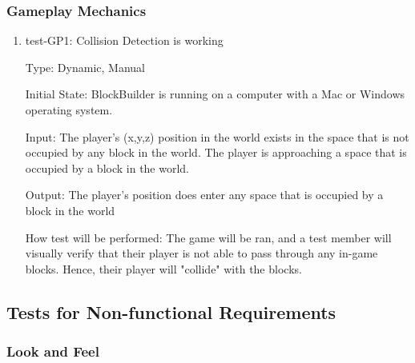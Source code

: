 \documentclass[12pt, titlepage]{article}
\begin{document}
\subsubsection{Gameplay Mechanics}

\begin{enumerate}

\item{test-GP1: Collision Detection is working\\}

Type: Dynamic, Manual
					
Initial State: BlockBuilder is running on a computer with a Mac or Windows operating system.
					
Input: The player's (x,y,z) position in the world exists in the space that is not occupied by any block in the world. The player is approaching a space that is occupied by a block in the world.
					
Output: The player's position does enter any space that is occupied by a block in the world
					
How test will be performed: The game will be ran, and a test member will visually verify that their player is not able to pass through any in-game blocks. Hence, their player will "collide" with the blocks.

\end{enumerate}

\subsection{Tests for Non-functional Requirements}

\subsubsection{Look and Feel}
\end{document}
